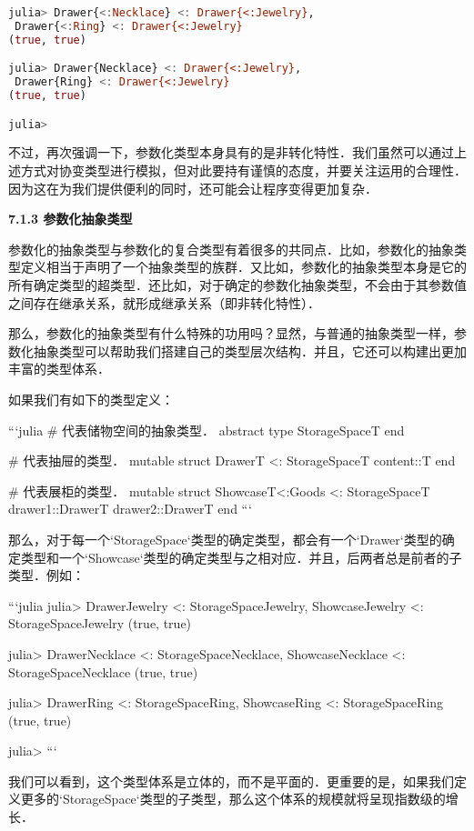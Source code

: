 \begin{lstlisting}[language=julia]
julia> Drawer{<:Necklace} <: Drawer{<:Jewelry},
 Drawer{<:Ring} <: Drawer{<:Jewelry}
(true, true)

julia> Drawer{Necklace} <: Drawer{<:Jewelry},
 Drawer{Ring} <: Drawer{<:Jewelry}
(true, true)

julia> 
\end{lstlisting}

不过，再次强调一下，参数化类型本身具有的是非转化特性．我们虽然可以通过上述方式对协变类型进行模拟，但对此要持有谨慎的态度，并要关注运用的合理性．因为这在为我们提供便利的同时，还可能会让程序变得更加复杂．

\textbf{7.1.3 参数化抽象类型}

参数化的抽象类型与参数化的复合类型有着很多的共同点．比如，参数化的抽象类型定义相当于声明了一个抽象类型的族群．又比如，参数化的抽象类型本身是它的所有确定类型的超类型．还比如，对于确定的参数化抽象类型，不会由于其参数值之间存在继承关系，就形成继承关系（即非转化特性）．

那么，参数化的抽象类型有什么特殊的功用吗？显然，与普通的抽象类型一样，参数化抽象类型可以帮助我们搭建自己的类型层次结构．并且，它还可以构建出更加丰富的类型体系．

如果我们有如下的类型定义：

```julia
# 代表储物空间的抽象类型．
abstract type StorageSpace{T} end

# 代表抽屉的类型．
mutable struct Drawer{T} <: StorageSpace{T}
    content::T
end

# 代表展柜的类型．
mutable struct Showcase{T<:Goods} <: StorageSpace{T}
    drawer1::Drawer{T}
    drawer2::Drawer{T}
end
```

那么，对于每一个`StorageSpace`类型的确定类型，都会有一个`Drawer`类型的确定类型和一个`Showcase`类型的确定类型与之相对应．并且，后两者总是前者的子类型．例如：

```julia
julia> Drawer{Jewelry} <: StorageSpace{Jewelry}, Showcase{Jewelry} <: StorageSpace{Jewelry}
(true, true)

julia> Drawer{Necklace} <: StorageSpace{Necklace}, Showcase{Necklace} <: StorageSpace{Necklace}
(true, true)

julia> Drawer{Ring} <: StorageSpace{Ring}, Showcase{Ring} <: StorageSpace{Ring}
(true, true)

julia> 
```

我们可以看到，这个类型体系是立体的，而不是平面的．更重要的是，如果我们定义更多的`StorageSpace`类型的子类型，那么这个体系的规模就将呈现指数级的增长．

